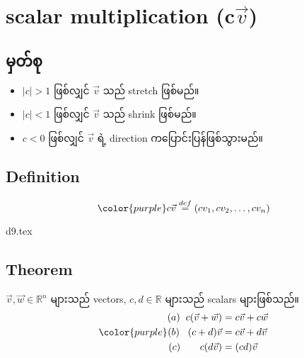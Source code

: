 \section{scalar multiplication (c$\vec{v}$)}
\subsection{မှတ်စု}
\begin{itemize}
    \item $|c|>1$ ဖြစ်လျှင် $\vec{v}$ သည် stretch ဖြစ်မည်။
    \item $|c|<1$ ဖြစ်လျှင် $\vec{v}$ သည် shrink ဖြစ်မည်။
    \item $c<0$ ဖြစ်လျှင် $\vec{v}$ ရဲ့ direction ကပြောင်းပြန်ဖြစ်သွားမည်။
\end{itemize}
\subsection{Definition}
\begin{equation}
    {\color{purple} c\vec{v}\stackrel{def}{=}(cv_1,cv_2,\dots,cv_n)}
\end{equation}
\begin{center}
    {d9.tex}
\end{center}

\subsection{Theorem}
$\vec{v}, \vec{w} \in \mathbb{R}^n$ များသည် vectors, $c, d \in \mathbb{R}$ များသည် scalars များဖြစ်သည်။
\begin{equation}
    {\color{purple}
        \begin{split}
            (a) \hspace{2mm} c(\vec{v}+\vec{w}) & =c\vec{v}+c\vec{w} \\
            (b) \hspace{3mm} (c+d)\vec{v}       & =c\vec{v}+d\vec{v} \\
            (c) \hspace{7mm} c(d\vec{v})        & =(cd)\vec{v}
        \end{split}}
    \label{eq:scalar-multiplication-theorem}
\end{equation}
